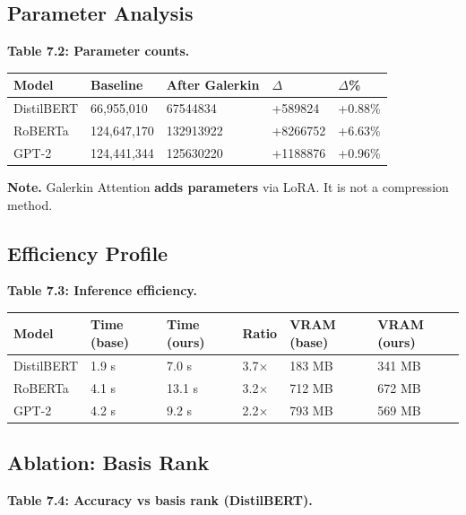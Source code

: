 \subsection{Parameter Analysis}

\textbf{Table 7.2: Parameter counts.}

\begin{table}[H]
\centering
\small
\begin{tabular}{lllll}
\toprule
\textbf{Model} & \textbf{Baseline} & \textbf{After Galerkin} & \textbf{$\Delta$} & \textbf{$\Delta$\%} \\
\midrule
DistilBERT & 66,955,010 & 67544834 & +589824 & +0.88\% \\
RoBERTa & 124,647,170 & 132913922 & +8266752 & +6.63\% \\
GPT-2 & 124,441,344 & 125630220 & +1188876 & +0.96\% \\
\bottomrule
\end{tabular}
\end{table}

\textbf{Note.} Galerkin Attention \textbf{adds parameters} via LoRA. It is not a 
compression method.

\subsection{Efficiency Profile}

\textbf{Table 7.3: Inference efficiency.}

\begin{table}[H]
\centering
\small
\begin{tabular}{llllll}
\toprule
\textbf{Model} & \textbf{Time (base)} & \textbf{Time (ours)} & \textbf{Ratio} & \textbf{VRAM (base)} & \textbf{VRAM (ours)} \\
\midrule
DistilBERT & 1.9 s & 7.0 s & 3.7$\times$ & 183 MB & 341 MB \\
RoBERTa & 4.1 s & 13.1 s & 3.2$\times$ & 712 MB & 672 MB \\
GPT-2 & 4.2 s & 9.2 s & 2.2$\times$ & 793 MB & 569 MB \\
\bottomrule
\end{tabular}
\end{table}

\subsection{Ablation: Basis Rank}

\textbf{Table 7.4: Accuracy vs basis rank (DistilBERT).}


